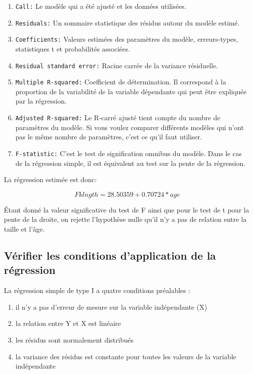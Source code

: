 \documentclass[
  12pt,
]{book}
\providecommand{\tightlist}{%
  \setlength{\itemsep}{0pt}\setlength{\parskip}{0pt}}
\begin{document}
\begin{enumerate}
\def\labelenumi{\arabic{enumi}.}
\tightlist
\item
  \texttt{Call:} Le modèle qui a été ajusté et les données utilisées.
\item
  \texttt{Residuals:} Un sommaire statistique des résidus autour du modèle estimé.
\item
  \texttt{Coefficients:} Valeurs estimées des paramètres du modèle, erreurs-types, statistiques t et probabilités associées.
\item
  \texttt{Residual\ standard\ error:} Racine carrée de la variance résiduelle.
\item
  \texttt{Multiple\ R-squared:} Coefficient de détermination. Il correspond à la proportion de la variabilité de la variable dépendante qui peut être expliquée par la régression.
\item
  \texttt{Adjusted\ R-squared:} Le R-carré ajusté tient compte du nombre de paramètres du modèle. Si vous voulez comparer différents modèles qui n'ont pas le même nombre de paramètres, c'est ce qu'il faut utiliser.
\item
  \texttt{F-statistic:} C'est le test de signification omnibus du modèle. Dans le cas de la régression simple, il est équivalent au test sur la pente de la régression.
\end{enumerate}

La régression estimée est donc:

\[ Fklngth = 28.50359 + 0.70724 * age\]

Étant donné la valeur significative du test de F ainsi que pour le test de t pour la pente de la droite, on rejette l'hypothèse nulle qu'il n'y a pas de relation entre la taille et l'âge.

\hypertarget{vuxe9rifier-les-conditions-dapplication-de-la-ruxe9gression}{%
\subsection{Vérifier les conditions d'application de la régression}\label{vuxe9rifier-les-conditions-dapplication-de-la-ruxe9gression}}

La régression simple de type I a quatre conditions préalables :

\begin{enumerate}
\def\labelenumi{\arabic{enumi}.}
\tightlist
\item
  il n'y a pas d'erreur de mesure sur la variable indépendante (X)
\item
  la relation entre Y et X est linéaire
\item
  les résidus sont normalement distribués
\item
  la variance des résidus est constante pour toutes les valeurs de la variable indépendante
\end{enumerate}
\end{document}
